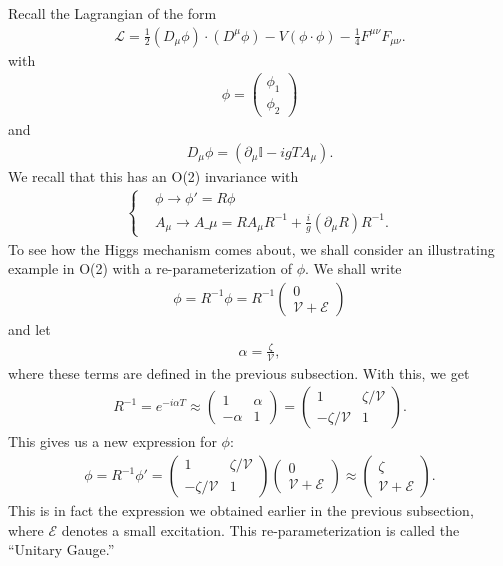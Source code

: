 \documentclass[a4paper,11pt]{article}
\numberwithin{equation}{section}
\theoremstyle{definition}
\newcommand{\p}{\partial}
\newcommand{\lag}{\mathcal{L}}
\begin{document}
Recall the Lagrangian of the form
\begin{align}
\lag = \frac{1}{2}(D_\mu\phi)\cdot(D^\mu\phi) - V(\phi\cdot\phi) - \frac{1}{4}F^{\mu\nu}F_{\mu\nu}.
\end{align}
with 
\begin{align}
\phi = \begin{pmatrix}
\phi_1\\\phi_2
\end{pmatrix}
\end{align}
and
\begin{align}
D_\mu\phi = (\p_\mu \mathbb{I} - igTA_\mu).
\end{align}
We recall that this has an O(2) invariance with
\begin{align}
\begin{cases}
&\phi \to \phi' = R\phi\\
&A_\mu\to A\_\mu = RA_\mu R^{-1} + \frac{i}{g}(\p_\mu R)R^{-1}.
\end{cases}
\end{align}
To see how the Higgs mechanism comes about, we shall consider an illustrating example in O(2) with a re-parameterization of $\phi$. We shall write 
\begin{align}
\phi = R^{-1}\phi = R^{-1}\begin{pmatrix}
0\\\mathcal{V} + \mathcal{E}
\end{pmatrix}
\end{align}
and let
\begin{align}
\alpha = \frac{\zeta}{\mathcal{V}},
\end{align}
where these terms are defined in the previous subsection. With this, we get
\begin{align}
R^{-1} = e^{-i\alpha T} \approx \begin{pmatrix}
1 & \alpha \\
-\alpha & 1
\end{pmatrix}
=
\begin{pmatrix}
1 & \zeta/\mathcal{V}\\
-\zeta/\mathcal{V} & 1
\end{pmatrix}.
\end{align}
This gives us a new expression for $\phi$:
\begin{align}
\phi = R^{-1}\phi' = \begin{pmatrix}
1 & \zeta/\mathcal{V}\\
-\zeta/\mathcal{V} & 1
\end{pmatrix}\begin{pmatrix}
0\\\mathcal{V} + \mathcal{E}
\end{pmatrix} \approx \begin{pmatrix}
\zeta \\ \mathcal{V} + \mathcal{E}
\end{pmatrix}.
\end{align}
This is in fact the expression we obtained earlier in the previous subsection, where $\mathcal{E}$ denotes a small excitation. This re-parameterization is called the ``Unitary Gauge.''\\
\end{document}
